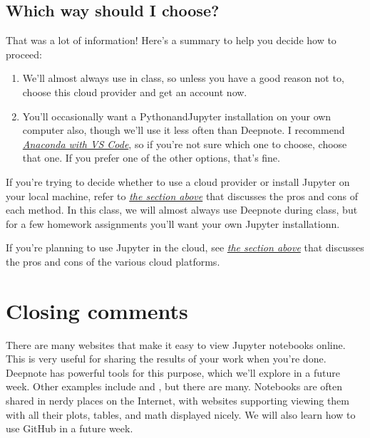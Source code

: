 \documentclass[letterpaper,10pt,english]{jupyterBook}
\begin{document}
\subsection{Which way should I choose?}
\label{\detokenize{chapter-3-jupyter:which-way-should-i-choose}}
\sphinxAtStartPar
That was a lot of information!  Here’s a summary to help you decide how to proceed:
\begin{enumerate}
%
\item {} 
\sphinxAtStartPar
We’ll almost always use  in class, so unless you have a good reason not to, choose this cloud provider and get an account now.

\item {} 
\sphinxAtStartPar
You’ll occasionally want a Python\sphinxhyphen{}and\sphinxhyphen{}Jupyter installation on your own computer also, though we’ll use it less often than Deepnote.  I recommend {\hyperref[\detokenize{chapter-3-jupyter:getting-jupyter-inside-vs-code}]{\emph{Anaconda with VS Code}}}, so if you’re not sure which one to choose, choose that one.  If you prefer one of the other options, that’s fine.

\end{enumerate}

\sphinxAtStartPar
If you’re trying to decide whether to use a cloud provider or install Jupyter on your local machine, refer to {\hyperref[\detokenize{chapter-3-jupyter:jupyter-on-your-machine}]{\emph{the section above}}} that discusses the pros and cons of each method.  In this class, we will almost always use Deepnote during class, but for a few homework assignments you’ll want your own Jupyter installationn.

\sphinxAtStartPar
If you’re planning to use Jupyter in the cloud, see {\hyperref[\detokenize{chapter-3-jupyter:jupyter-in-the-cloud}]{\emph{the section above}}} that discusses the pros and cons of the various cloud platforms.


\section{Closing comments}
\label{\detokenize{chapter-3-jupyter:closing-comments}}
\sphinxAtStartPar
There are many websites that make it easy to view Jupyter notebooks online.  This is very useful for sharing the results of your work when you’re done.  Deepnote has powerful tools for this purpose, which we’ll explore in a future week.  Other examples include  and , but there are many.  Notebooks are often shared in nerdy places on the Internet, with websites supporting viewing them with all their plots, tables, and math displayed nicely.  We will also learn how to use GitHub in a future week.
\end{document}
